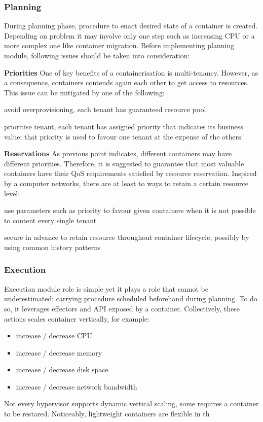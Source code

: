 \subsubsection{Planning}
During planning phase, procedure to enact desired state of a container is created. Depending on problem it may involve only one step such as increasing CPU or a more complex one like container migration. Before implementing planning module, following issues should be taken into consideration:
\begin{asparaenum}
 \item[\textbf{Priorities}] One of key benefits of a containerisation is multi-tenancy. However, as a consequence, containers contends again each other to get access to resources. This issue can be mitigated by one of the following: \begin{inparaenum}[1)]
    \item avoid overprovisioning, each tenant has guaranteed resource pool
    \item prioritise tenant, each tenant has assigned priority that indicates its business value; that priority is used to favour one tenant at the expense of the others.
 \end{inparaenum}
 
 \item[\textbf{Reservations}] As previous point indicates, different containers may have different priorities. Therefore, it is suggested to guarantee that most valuable containers have their QoS requirements satisfied by resource reservation. Inspired by a computer networks, there are at least to ways to retain a certain resource level: 
\begin{inparaenum}[1)]
    \item use parameters such as priority to favour given containers when it is not possible to content every single tenant \cite{nichols1998definition}
    \item secure in advance to retain resource throughout container lifecycle, possibly by using common history patterns \cite{braden1997resource}
 \end{inparaenum}
\end{asparaenum}


\subsubsection{Execution}
Execution module role is simple yet it plays a role that cannot be underestimated: carrying procedure scheduled beforehand during planning. To do so, it leverages effectors and API exposed by a container. Collectively, these actions scales container vertically, for example:
\begin{itemize}
 \item increase / decrease CPU
 \item increase / decrease memory
 \item increase / decrease disk space
 \item increase / decrease network bandwidth
\end{itemize}
Not every hypervisor supports dynamic vertical scaling, some requires a container to be restared. Noticeably, lightweight containers are flexible in th

